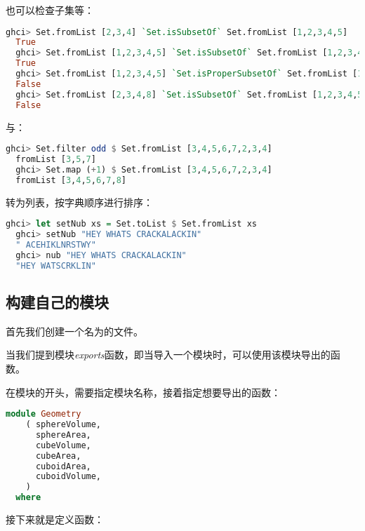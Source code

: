 \documentclass[./main.tex]{subfiles}
\begin{document}
也可以检查子集等：

\begin{lstlisting}[language=Haskell]
  ghci> Set.fromList [2,3,4] `Set.isSubsetOf` Set.fromList [1,2,3,4,5]
  True
  ghci> Set.fromList [1,2,3,4,5] `Set.isSubsetOf` Set.fromList [1,2,3,4,5]
  True
  ghci> Set.fromList [1,2,3,4,5] `Set.isProperSubsetOf` Set.fromList [1,2,3,4,5]
  False
  ghci> Set.fromList [2,3,4,8] `Set.isSubsetOf` Set.fromList [1,2,3,4,5]
  False
\end{lstlisting}

与：

\begin{lstlisting}[language=Haskell]
  ghci> Set.filter odd $ Set.fromList [3,4,5,6,7,2,3,4]
  fromList [3,5,7]
  ghci> Set.map (+1) $ Set.fromList [3,4,5,6,7,2,3,4]
  fromList [3,4,5,6,7,8]
\end{lstlisting}

转为列表，按字典顺序进行排序：

\begin{lstlisting}[language=Haskell]
  ghci> let setNub xs = Set.toList $ Set.fromList xs
  ghci> setNub "HEY WHATS CRACKALACKIN"
  " ACEHIKLNRSTWY"
  ghci> nub "HEY WHATS CRACKALACKIN"
  "HEY WATSCRKLIN"
\end{lstlisting}

\subsection*{构建自己的模块}

首先我们创建一个名为的文件。

当我们提到模块\textit{exports}函数，即当导入一个模块时，可以使用该模块导出的函数。

在模块的开头，需要指定模块名称，接着指定想要导出的函数：

\begin{lstlisting}[language=Haskell]
  module Geometry
    ( sphereVolume,
      sphereArea,
      cubeVolume,
      cubeArea,
      cuboidArea,
      cuboidVolume,
    )
  where
\end{lstlisting}

接下来就是定义函数：
\end{document}
